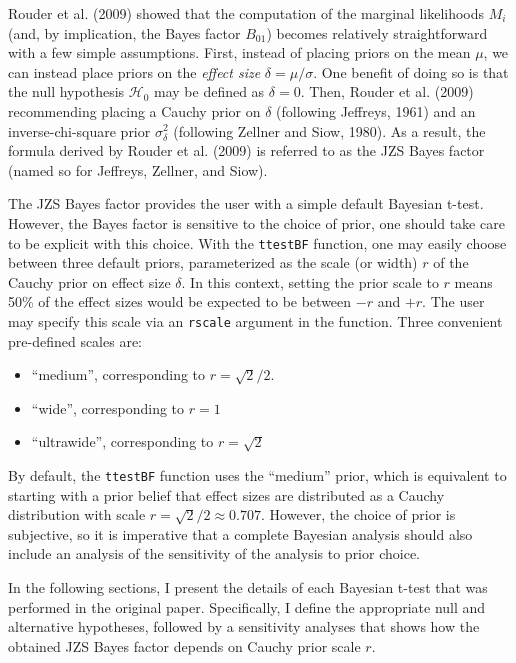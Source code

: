 \documentclass[english,floatsintext,doc]{apa6}
\providecommand{\tightlist}{%
  \setlength{\itemsep}{0pt}\setlength{\parskip}{0pt}}
\theoremstyle{definition}
\theoremstyle{definition}
\theoremstyle{definition}
\theoremstyle{remark}
\begin{document}
Rouder et al. (2009) showed that the computation of the marginal
likelihoods \(M_i\) (and, by implication, the Bayes factor \(B_{01}\))
becomes relatively straightforward with a few simple assumptions. First,
instead of placing priors on the mean \(\mu\), we can instead place
priors on the \emph{effect size} \(\delta = \mu/\sigma\). One benefit of
doing so is that the null hypothesis \(\mathcal{H}_0\) may be defined as
\(\delta=0\). Then, Rouder et al. (2009) recommending placing a Cauchy
prior on \(\delta\) (following Jeffreys, 1961) and an inverse-chi-square
prior \(\sigma_{\delta}^2\) (following Zellner and Siow, 1980). As a
result, the formula derived by Rouder et al. (2009) is referred to as
the JZS Bayes factor (named so for Jeffreys, Zellner, and Siow).

The JZS Bayes factor provides the user with a simple default Bayesian
t-test. However, the Bayes factor is sensitive to the choice of prior,
one should take care to be explicit with this choice. With the
\texttt{ttestBF} function, one may easily choose between three default
priors, parameterized as the scale (or width) \(r\) of the Cauchy prior
on effect size \(\delta\). In this context, setting the prior scale to
\(r\) means 50\% of the effect sizes would be expected to be between
\(-r\) and \(+r\). The user may specify this scale via an
\texttt{rscale} argument in the function. Three convenient pre-defined
scales are:

\begin{itemize}
\tightlist
\item
  \enquote{medium}, corresponding to \(r=\sqrt{2}/2\).
\item
  \enquote{wide}, corresponding to \(r=1\)
\item
  \enquote{ultrawide}, corresponding to \(r=\sqrt{2}\)
\end{itemize}

By default, the \texttt{ttestBF} function uses the \enquote{medium}
prior, which is equivalent to starting with a prior belief that effect
sizes are distributed as a Cauchy distribution with scale
\(r=\sqrt{2}/2 \approx 0.707\). However, the choice of prior is
subjective, so it is imperative that a complete Bayesian analysis should
also include an analysis of the sensitivity of the analysis to prior
choice.

In the following sections, I present the details of each Bayesian t-test
that was performed in the original paper. Specifically, I define the
appropriate null and alternative hypotheses, followed by a sensitivity
analyses that shows how the obtained JZS Bayes factor depends on Cauchy
prior scale \(r\).
\end{document}
